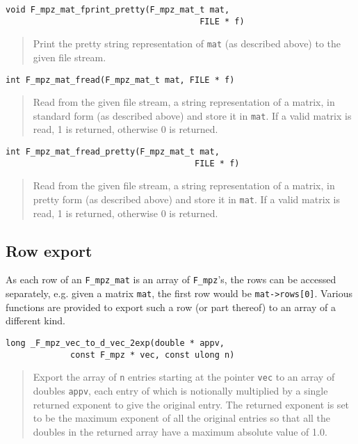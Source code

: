 \documentclass[a4paper,10pt]{article}
\newcommand{\code}{\lstinline}
\begin{document}
\begin{lstlisting}
void F_mpz_mat_fprint_pretty(F_mpz_mat_t mat, 
                                       FILE * f)
\end{lstlisting}
\begin{quote}
Print the pretty string representation of \code{mat} (as described above) to the given file stream.
\end{quote}

\begin{lstlisting}
int F_mpz_mat_fread(F_mpz_mat_t mat, FILE * f)
\end{lstlisting}
\begin{quote}
Read from the given file stream, a string representation of a matrix, in standard form (as described
above) and store it in \code{mat}. If a valid matrix is read, 1 is returned, otherwise 0 is returned.
\end{quote}

\begin{lstlisting}
int F_mpz_mat_fread_pretty(F_mpz_mat_t mat, 
                                      FILE * f)
\end{lstlisting}
\begin{quote}
Read from the given file stream, a string representation of a matrix, in pretty form (as described
above) and store it in \code{mat}. If a valid matrix is read, 1 is returned, otherwise 0 is returned.
\end{quote}

\subsection{Row export}

As each row of an \code{F_mpz_mat} is an array of \code{F_mpz}'s, the rows can be accessed separately,
e.g. given a matrix \code{mat}, the first row would be \code{mat->rows[0]}. Various functions are 
provided to export such a row (or part thereof) to an array of a different kind.

\begin{lstlisting}
long _F_mpz_vec_to_d_vec_2exp(double * appv, 
             const F_mpz * vec, const ulong n)
\end{lstlisting}
\begin{quote}
Export the array of \code{n} entries starting at the pointer \code{vec} to an array of doubles \code{appv},
each entry of which is notionally multiplied by a single returned exponent to give the original entry. The
returned exponent is set to be the maximum exponent of all the original entries so that all the doubles
in the returned array have a maximum absolute value of 1.0.
\end{quote}
\end{document}
